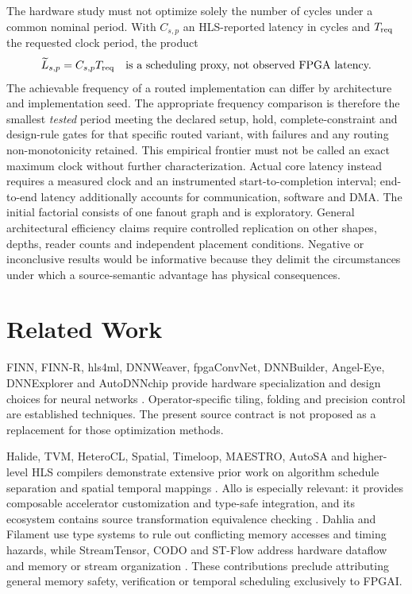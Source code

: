 \documentclass{article}
\begin{document}
The hardware study must not optimize solely the number of cycles under a common nominal period. With $C_{s,p}$ an HLS-reported latency in cycles and $T_{\rm req}$ the requested clock period, the product
\begin{equation}
\widetilde{L}_{s,p}=C_{s,p}T_{\rm req}
\quad\text{is a scheduling proxy, not observed FPGA latency.}
\label{eq:hls-latency-warning}
\end{equation}
The achievable frequency of a routed implementation can differ by architecture and implementation seed. The appropriate frequency comparison is therefore the smallest \emph{tested} period meeting the declared setup, hold, complete-constraint and design-rule gates for that specific routed variant, with failures and any routing non-monotonicity retained. This empirical frontier must not be called an exact maximum clock without further characterization. Actual core latency instead requires a measured clock and an instrumented start-to-completion interval; end-to-end latency additionally accounts for communication, software and DMA. The initial factorial consists of one fanout graph and is exploratory. General architectural efficiency claims require controlled replication on other shapes, depths, reader counts and independent placement conditions. Negative or inconclusive results would be informative because they delimit the circumstances under which a source-semantic advantage has physical consequences.

\section{Related Work}
\label{sec:related}

FINN, FINN-R, hls4ml, DNNWeaver, fpgaConvNet, DNNBuilder, Angel-Eye, DNNExplorer and AutoDNNchip provide hardware specialization and design choices for neural networks \cite{finn2017,finnr2018,hls4ml2018,hls4mlcnn2021,dnnweaver2016,fpgaconvnet2016,dnnbuilder2018,angeleye2018,dnnexplorer2020,autodnnchip2020}. Operator-specific tiling, folding and precision control are established techniques. The present source contract is not proposed as a replacement for those optimization methods.


Halide, TVM, HeteroCL, Spatial, Timeloop, MAESTRO, AutoSA and higher-level HLS compilers demonstrate extensive prior work on algorithm schedule separation and spatial temporal mappings \cite{halide2013,tvm2018,heterocl2019,spatial2018,timeloop2019,maestro2019,autosa2021,pluto2008,scalehls2022,hida2024,mlir2021,calyx2021}. Allo is especially relevant: it provides composable accelerator customization and type-safe integration, and its ecosystem contains source transformation equivalence checking \cite{allo2024}. Dahlia and Filament use type systems to rule out conflicting memory accesses and timing hazards, while StreamTensor, CODO and ST-Flow address hardware dataflow and memory or stream organization \cite{dahlia2020,filament2023,streamtensor2025,codo2026,stflow2026}. These contributions preclude attributing general memory safety, verification or temporal scheduling exclusively to FPGAI.
\end{document}
